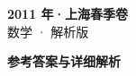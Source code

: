 \documentclass[zihao=-4, a4paper]{ctexart}
\begin{document}
\begin{center}
  {\Large\bfseries 2011 年·上海春季卷}\\[4pt]
  {\large 数学 · 解析版}
\end{center}
\medskip
{}

\clearpage
{}
\begin{center}{\Large\bfseries 参考答案与详细解析}\end{center}
\medskip

\end{document}
